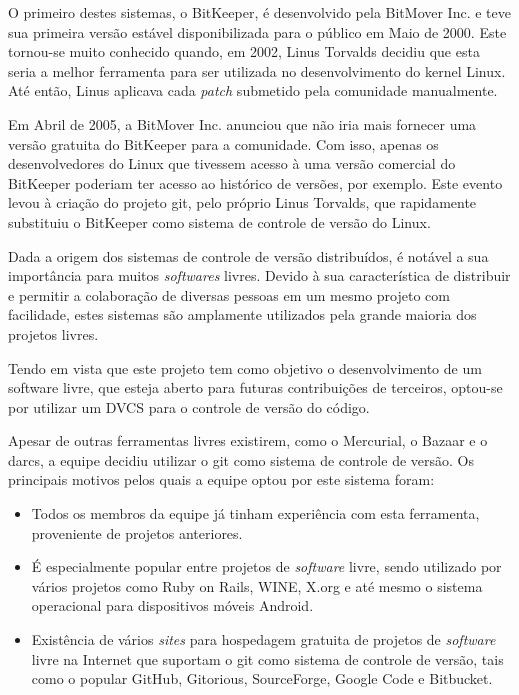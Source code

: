 O primeiro destes sistemas, o BitKeeper, é desenvolvido pela BitMover Inc. e teve sua primeira versão estável disponibilizada para o público em Maio de 2000.
Este tornou-se muito conhecido quando, em 2002, Linus Torvalds decidiu que esta seria a melhor ferramenta para ser utilizada no desenvolvimento do kernel Linux.
Até então, Linus aplicava cada \emph{patch} submetido pela comunidade manualmente.

Em Abril de 2005, a BitMover Inc. anunciou que não iria mais fornecer uma versão gratuita do BitKeeper para a comunidade.
Com isso, apenas os desenvolvedores do Linux que tivessem acesso à uma versão comercial do BitKeeper poderiam ter acesso ao histórico de versões, por exemplo.
Este evento levou à criação do projeto git, pelo próprio Linus Torvalds, que rapidamente substituiu o BitKeeper como sistema de controle de versão do Linux.

Dada a origem dos sistemas de controle de versão distribuídos, é notável a sua importância para muitos \emph{softwares} livres.
Devido à sua característica de distribuir e permitir a colaboração de diversas pessoas em um mesmo projeto com facilidade, estes sistemas são amplamente utilizados pela grande maioria dos projetos livres.

Tendo em vista que este projeto tem como objetivo o desenvolvimento de um software livre, que esteja aberto para futuras contribuições de terceiros, optou-se por utilizar um DVCS para o controle de versão do código.

Apesar de outras ferramentas livres existirem, como o Mercurial, o Bazaar e o darcs, a equipe decidiu utilizar o git como sistema de controle de versão.
Os principais motivos pelos quais a equipe optou por este sistema foram:

\begin{itemize}
	\item Todos os membros da equipe já tinham experiência com esta ferramenta, proveniente de projetos anteriores.
	\item É especialmente popular entre projetos de \emph{software} livre, sendo utilizado por vários projetos como Ruby on Rails, WINE, X.org e até mesmo o sistema operacional para dispositivos móveis Android.
	\item Existência de vários \emph{sites} para hospedagem gratuita de projetos de \emph{software} livre na Internet que suportam o git como sistema de controle de versão, tais como o popular GitHub, Gitorious, SourceForge, Google Code e Bitbucket.
\end{itemize}

